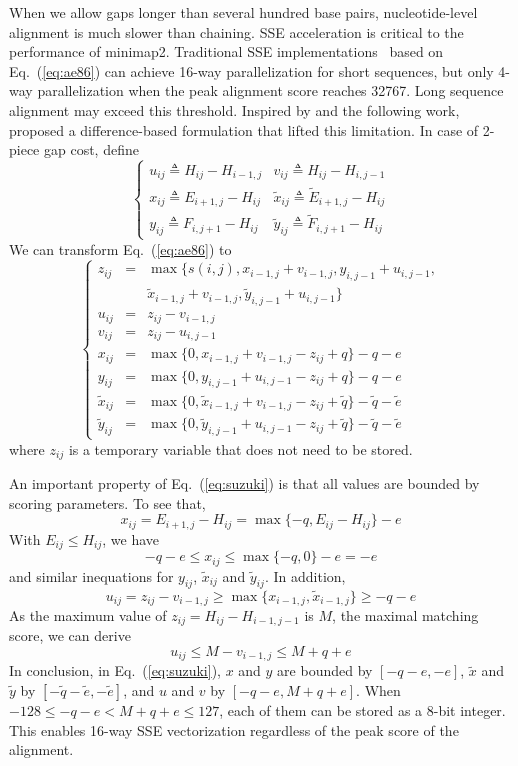 \documentclass{bioinfo}
\begin{document}
\begin{methods}
When we allow gaps longer than several hundred base pairs, nucleotide-level
alignment is much slower than chaining. SSE acceleration is critical to the
performance of minimap2. Traditional SSE implementations~\citep{Farrar:2007hs}
based on Eq.~(\ref{eq:ae86}) can achieve 16-way parallelization for short
sequences, but only 4-way parallelization when the peak alignment score reaches
32767. Long sequence alignment may exceed this threshold. Inspired by
\citet{Wu:1996aa} and the following work, \citet{Suzuki:2018aa} proposed a
difference-based formulation that lifted this limitation.
In case of 2-piece gap cost, define
\[
\left\{\begin{array}{ll}
u_{ij}\triangleq H_{ij}-H_{i-1,j} & v_{ij}\triangleq H_{ij}-H_{i,j-1} \\
x_{ij}\triangleq E_{i+1,j}-H_{ij} & \tilde{x}_{ij}\triangleq \tilde{E}_{i+1,j}-H_{ij} \\
y_{ij}\triangleq F_{i,j+1}-H_{ij} & \tilde{y}_{ij}\triangleq \tilde{F}_{i,j+1}-H_{ij}
\end{array}\right.
\]
We can transform Eq.~(\ref{eq:ae86}) to
\begin{equation}\label{eq:suzuki}
\left\{\begin{array}{lll}
z_{ij}&=&\max\{s(i,j),x_{i-1,j}+v_{i-1,j},y_{i,j-1}+u_{i,j-1},\\
&&\tilde{x}_{i-1,j}+v_{i-1,j},\tilde{y}_{i,j-1}+u_{i,j-1}\}\\
u_{ij}&=&z_{ij}-v_{i-1,j}\\
v_{ij}&=&z_{ij}-u_{i,j-1}\\
x_{ij}&=&\max\{0,x_{i-1,j}+v_{i-1,j}-z_{ij}+q\}-q-e\\
y_{ij}&=&\max\{0,y_{i,j-1}+u_{i,j-1}-z_{ij}+q\}-q-e\\
\tilde{x}_{ij}&=&\max\{0,\tilde{x}_{i-1,j}+v_{i-1,j}-z_{ij}+\tilde{q}\}-\tilde{q}-\tilde{e}\\
\tilde{y}_{ij}&=&\max\{0,\tilde{y}_{i,j-1}+u_{i,j-1}-z_{ij}+\tilde{q}\}-\tilde{q}-\tilde{e}
\end{array}\right.
\end{equation}
where $z_{ij}$ is a temporary variable that does not need to be stored.

An important property of Eq.~(\ref{eq:suzuki}) is that all values are bounded
by scoring parameters. To see that,
\[
x_{ij}=E_{i+1,j}-H_{ij}=\max\{-q,E_{ij}-H_{ij}\}-e
\]
With $E_{ij}\le H_{ij}$, we have
\[
-q-e\le x_{ij}\le\max\{-q,0\}-e=-e
\]
and similar inequations for $y_{ij}$, $\tilde{x}_{ij}$ and $\tilde{y}_{ij}$.
In addition,
\[
u_{ij}=z_{ij}-v_{i-1,j}\ge\max\{x_{i-1,j},\tilde{x}_{i-1,j}\}\ge-q-e
\]
As the maximum value of $z_{ij}=H_{ij}-H_{i-1,j-1}$ is $M$, the maximal
matching score, we can derive
\[
u_{ij}\le M-v_{i-1,j}\le M+q+e
\]
In conclusion, in Eq.~(\ref{eq:suzuki}), $x$ and $y$ are bounded by $[-q-e,-e]$,
$\tilde{x}$ and $\tilde{y}$ by $[-\tilde{q}-\tilde{e},-\tilde{e}]$, and $u$ and
$v$ by $[-q-e,M+q+e]$. When $-128\le-q-e<M+q+e\le127$, each of them can be stored as
a 8-bit integer. This enables 16-way SSE vectorization regardless of the peak
score of the alignment.


\end{methods}
\end{document}
